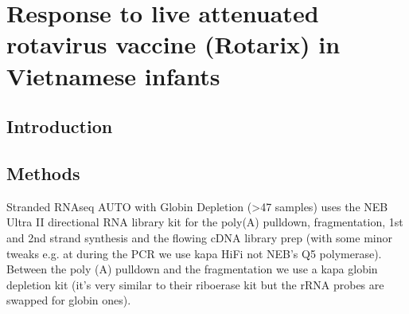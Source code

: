 %
%

\chapter{Response to live attenuated rotavirus vaccine (Rotarix) in Vietnamese infants}

\section{Introduction}

\section{Methods}

Stranded RNAseq AUTO with Globin Depletion (>47 samples) uses the NEB Ultra
II directional RNA library kit for the poly(A) pulldown, fragmentation, 1st and
2nd strand synthesis and the flowing cDNA library prep (with some minor tweaks
e.g. at during the PCR we use kapa HiFi not NEB's Q5 polymerase). Between the
poly (A) pulldown and the fragmentation we use a kapa globin depletion kit
(it's very similar to their riboerase kit but the rRNA probes are swapped for
globin ones).
